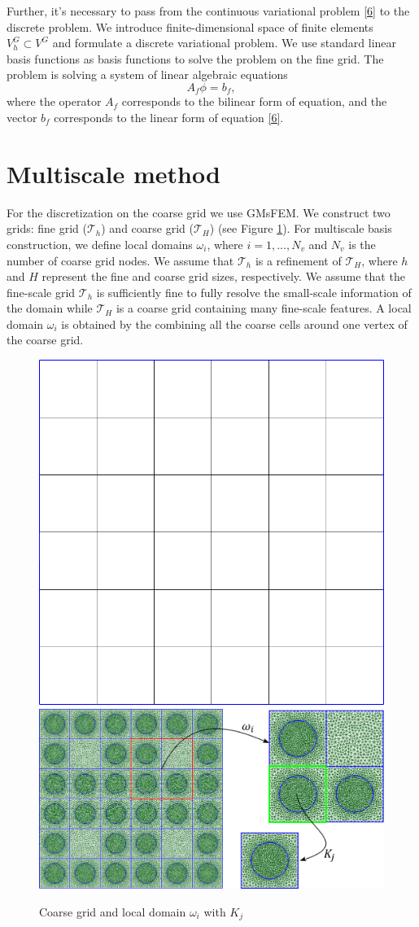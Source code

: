 \documentclass[authoryear]{elsarticle}
\begin{document}
Further, it's necessary to pass from the continuous variational problem \eqref{6} to the discrete problem. 
We introduce finite-dimensional space of finite elements $V^G_h \subset V^G$ and formulate a discrete variational problem. 
We use standard linear basis functions as basis functions to solve the problem on the fine grid.
The problem is solving a system of linear algebraic equations
\begin{equation}\label{7}
	A_f \phi = b_f,
\end{equation}
where the operator $A_f$ corresponds to the bilinear form of equation, and the vector $b_f$ corresponds to the linear form of equation \eqref{6}.

\section{Multiscale method}
For the discretization on the coarse grid we use GMsFEM.
We construct two grids: fine grid ($\mathcal{T}_h$) and coarse grid ($\mathcal{T}_H$) (see Figure \ref{p1}).
For multiscale basis construction, we define local domains $\omega_i$, where $i = 1,..., N_v$ and $N_v$ is the number of coarse grid nodes.
We assume that $\mathcal{T}_h$ is a refinement of $\mathcal{T}_H$, where $h$ and $H$ represent the fine and coarse grid sizes, respectively. 
We assume that the fine-scale grid $\mathcal{T}_h$ is sufficiently fine to fully resolve the small-scale information of the domain  while $\mathcal{T}_H$ is a coarse grid containing many fine-scale features.
A local domain $\omega_i$ is obtained by the combining all the coarse cells around one vertex of the coarse grid. 

\begin{figure}[ht]
	\centering
		\includegraphics[width=0.3\linewidth]{coarse_grid.png} \hspace{2em}
		\includegraphics[width=0.57\linewidth]{omega.png} 
	\caption{Coarse grid and local domain $\omega_i$ with $K_j$}
	\label{p1}
\end{figure} 
\end{document}
